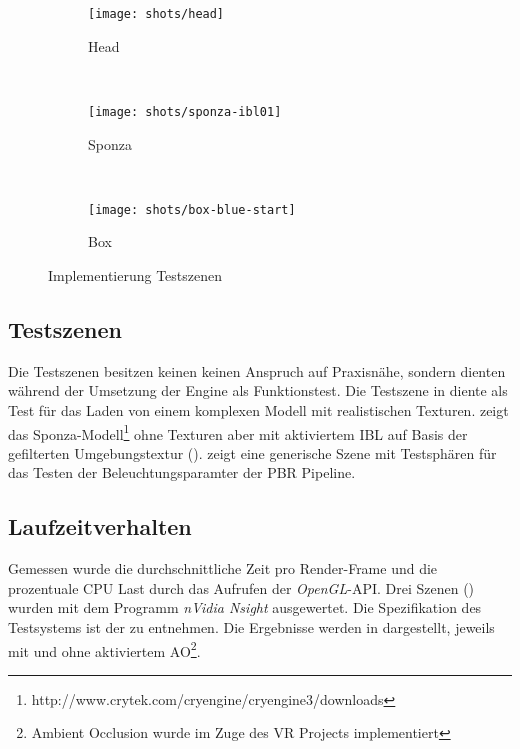 \begin{figure}
\begin{subfigure}{\textwidth}
	\centering
	\texttt{[image: shots/head]}
	\caption{Head}\label{fig:impl-scenes-head}
\end{subfigure}\\
\begin{subfigure}{\textwidth}
	\centering
	\texttt{[image: shots/sponza-ibl01]}
	\caption{Sponza}\label{fig:impl-scenes-sponza}
\end{subfigure}\\
\begin{subfigure}{\textwidth}
	\centering
	\texttt{[image: shots/box-blue-start]}
	\caption{Box}\label{fig:impl-scenes-box}
\end{subfigure}
\caption{Implementierung Testszenen}
\end{figure}

\subsection{Testszenen}\label{sec:testszenen-impl}

Die Testszenen besitzen keinen keinen Anspruch auf Praxisnähe, sondern dienten während der Umsetzung der Engine als Funktionstest. Die Testszene in  diente als Test für das Laden von einem komplexen Modell mit realistischen Texturen.  zeigt das Sponza-Modell\footnote{http://www.crytek.com/cryengine/cryengine3/downloads} ohne Texturen aber mit aktiviertem \ac{IBL} auf Basis der gefilterten Umgebungstextur ().  zeigt eine generische Szene mit Testsphären für das Testen der Beleuchtungsparamter der \ac{PBR} Pipeline.

\subsection{Laufzeitverhalten}\label{sec:laufzeit-impl}

Gemessen wurde die durchschnittliche Zeit pro Render-Frame und die prozentuale CPU Last durch das Aufrufen der \textit{OpenGL}-\ac{API}. Drei Szenen () wurden mit dem Programm \textit{nVidia Nsight} ausgewertet. Die Spezifikation des Testsystems ist der  zu entnehmen. Die Ergebnisse werden in  dargestellt, jeweils mit und ohne aktiviertem \ac{AO}\footnote{Ambient Occlusion wurde im Zuge des VR Projects implementiert}.


